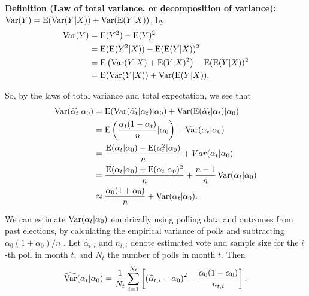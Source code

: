 \documentclass[thesis.tex]{subfiles}
\begin{document}
\bigskip

\noindent\textbf{Definition (Law of total variance, or decomposition of variance):} \(\operatorname{Var}(Y) = \operatorname{E}(\operatorname{Var}(Y | X)) + \operatorname{Var}(\operatorname{E}(Y | X))\), by \begin{equation}
\begin{aligned}
	\operatorname{Var}(Y) &= \operatorname{E}(Y^2) - \operatorname{E}(Y)^2 \\
	&= \operatorname{E}(\operatorname{E}(Y^2 | X)) - \operatorname{E}(\operatorname{E}(Y | X))^2 \\
	&= \operatorname{E}\left(\operatorname{Var}(Y|X) + \operatorname{E}(Y | X)^2\right) - \operatorname{E}(\operatorname{E}(Y | X))^2 \\
	&= \operatorname{E}(\operatorname{Var}(Y | X)) + \operatorname{Var}(\operatorname{E}(Y | X)).
\end{aligned}
\end{equation}

\bigskip
\bigskip

\noindent So, by the laws of total variance and total expectation, we see that \begin{equation}\begin{aligned}
	\operatorname{Var}(\widehat{\alpha_t} | \alpha_0)
	&= \operatorname{E}(\operatorname{Var}(\widehat{\alpha_t} | \alpha_t) | \alpha_0) + \operatorname{Var}(\operatorname{E}(\widehat{\alpha_t} | \alpha_t) | \alpha_0) \\
	&= \operatorname{E}\left(\frac{\alpha_t(1- \alpha_t)}{n} | \alpha_0\right) + \operatorname{Var}(\alpha_t | \alpha_0) \\
	&= \frac{\operatorname{E}(\alpha_t | \alpha_0) - \operatorname{E}(\alpha_t^2 | \alpha_0)}{n} + Var(\alpha_t | \alpha_0) \\
	&= \frac{\operatorname{E}(\alpha_t | \alpha_0) + \operatorname{E}(\alpha_t | \alpha_0)^2}{n} + \frac{n-1}{n}\operatorname{Var}(\alpha_t | \alpha_0) \\
	&\approx \frac{\alpha_0 (1 + \alpha_0)}{n} + \operatorname{Var}(\alpha_t | \alpha_0).
\end{aligned}
\end{equation}

We can estimate \(\operatorname{Var}(\alpha_t | \alpha_0)\) empirically using polling data and outcomes from past elections, by calculating the empirical variance of polls and subtracting \(\alpha_0 (1 + \alpha_0) / n\) . Let \(\widehat{\alpha}_{t, i}\) and \(n_{t, i}\) denote estimated vote and sample size for the \(i\)-th poll in month \(t\), and \(N_t\) the number of polls in month \(t\). Then \begin{equation}
\begin{aligned}
\widehat{\operatorname{Var}}(\alpha_t | \alpha_0) = \frac{1}{N_t} \sum_{i=1}^{N_t}\left[ \left( \widehat{\alpha}_{t, i} - \alpha_0\right)^2 - \frac{\alpha_0 (1 - \alpha_0)}{n_{t,i}} \right].
\end{aligned}
\end{equation}
\end{document}
